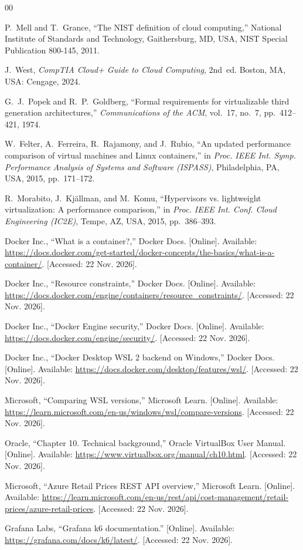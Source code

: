 \documentclass[conference,a4paper]{IEEEtran}
\begin{document}
\begin{thebibliography}{00}

 P.~Mell and T.~Grance, ``The NIST definition of cloud computing,'' National Institute of Standards and Technology, Gaithersburg, MD, USA, NIST Special Publication 800-145, 2011.

 J.~West, \textit{CompTIA Cloud+ Guide to Cloud Computing}, 2nd~ed. Boston, MA, USA: Cengage, 2024.

 G.~J.~Popek and R.~P.~Goldberg, ``Formal requirements for virtualizable third generation architectures,'' \textit{Communications of the ACM}, vol.~17, no.~7, pp.~412--421, 1974.

 W.~Felter, A.~Ferreira, R.~Rajamony, and J.~Rubio, ``An updated performance comparison of virtual machines and Linux containers,'' in \textit{Proc. IEEE Int. Symp. Performance Analysis of Systems and Software (ISPASS)}, Philadelphia, PA, USA, 2015, pp.~171--172.

 R.~Morabito, J.~Kj\"allman, and M.~Komu, ``Hypervisors vs. lightweight virtualization: A performance comparison,'' in \textit{Proc. IEEE Int. Conf. Cloud Engineering (IC2E)}, Tempe, AZ, USA, 2015, pp.~386--393.

 Docker Inc., ``What is a container?,'' Docker Docs. [Online]. Available: \url{https://docs.docker.com/get-started/docker-concepts/the-basics/what-is-a-container/}. [Accessed: 22 Nov. 2026].

 Docker Inc., ``Resource constraints,'' Docker Docs. [Online]. Available: \url{https://docs.docker.com/engine/containers/resource_constraints/}. [Accessed: 22 Nov. 2026].

 Docker Inc., ``Docker Engine security,'' Docker Docs. [Online]. Available: \url{https://docs.docker.com/engine/security/}. [Accessed: 22 Nov. 2026].

 Docker Inc., ``Docker Desktop WSL 2 backend on Windows,'' Docker Docs. [Online]. Available: \url{https://docs.docker.com/desktop/features/wsl/}. [Accessed: 22 Nov. 2026].

 Microsoft, ``Comparing WSL versions,'' Microsoft Learn. [Online]. Available: \url{https://learn.microsoft.com/en-us/windows/wsl/compare-versions}. [Accessed: 22 Nov. 2026].

 Oracle, ``Chapter 10. Technical background,'' Oracle VirtualBox User Manual. [Online]. Available: \url{https://www.virtualbox.org/manual/ch10.html}. [Accessed: 22 Nov. 2026].

 Microsoft, ``Azure Retail Prices REST API overview,'' Microsoft Learn. [Online]. Available: \url{https://learn.microsoft.com/en-us/rest/api/cost-management/retail-prices/azure-retail-prices}. [Accessed: 22 Nov. 2026].

 Grafana Labs, ``Grafana k6 documentation.'' [Online]. Available: \url{https://grafana.com/docs/k6/latest/}. [Accessed: 22 Nov. 2026].

\end{thebibliography}
\end{document}
